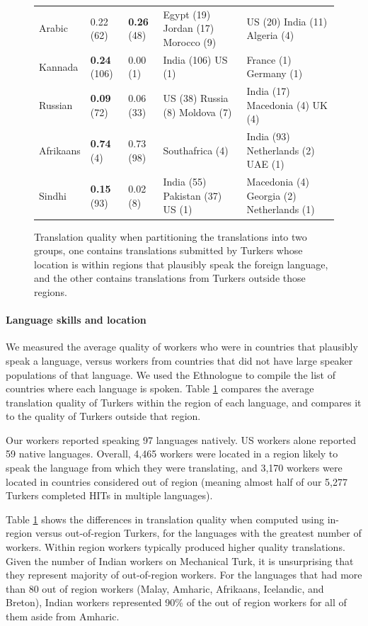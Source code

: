 \documentclass[11pt]{article}
\begin{document}
\begin{figure}
\begin{tabular}{lllll}
Arabic&0.22 (62) &\textbf{0.26} (48)&Egypt (19) Jordan (17) Morocco (9) &US (20) India (11) Algeria (4) \\
Kannada&\textbf{0.24} (106)&0.00 (1)&India (106) US (1) &France (1) Germany (1) \\
Russian&\textbf{0.09} (72)&0.06 (33)&US (38) Russia (8) Moldova (7) &India (17) Macedonia (4) UK (4) \\
Afrikaans&\textbf{0.74} (4)&0.73 (98)&Southafrica (4) &India (93) Netherlands (2) UAE (1) \\
Sindhi&\textbf{0.15} (93)&0.02 (8)&India (55) Pakistan (37) US (1) &Macedonia (4) Georgia (2) Netherlands (1) \\
\hline\hline
\end{tabular}
\normalsize
\caption{Translation quality when partitioning the translations into two groups, one contains translations submitted by Turkers whose location is within regions that plausibly speak the foreign language, and the other contains translations from Turkers outside those regions.} \label{region-summary}
\end{figure}


\paragraph{Language skills and location}

We measured the average quality of workers who were in countries that plausibly speak a language, versus workers from countries that did not have large speaker populations of that language.  We used the Ethnologue \cite{ethnologue} to compile the list of countries where each language is spoken.  Table \ref{region-summary} compares the average translation quality of Turkers within the region of each language, and compares it to the quality of Turkers outside that region. 

Our workers reported speaking 97 languages natively. US workers alone reported 59 native languages. Overall, 4,465 workers were located in a region likely to speak the language from which they were translating, and 3,170 workers were located in countries considered out of region (meaning almost half of our 5,277 Turkers completed HITs in multiple languages). 

Table \ref{region-summary} shows the differences in translation quality when computed using in-region versus out-of-region Turkers, for the languages with the greatest number of workers.  Within region workers typically produced higher quality translations. 
Given the number of Indian workers on Mechanical Turk, it is unsurprising that they represent majority of out-of-region workers.  For the languages that had more than 80 out of region workers (Malay, Amharic, Afrikaans, Icelandic, and Breton), Indian workers represented 90\% of the out of region workers for all of them aside from Amharic.
\end{document}
